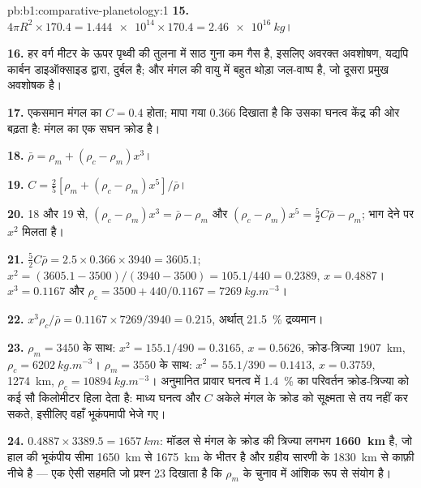 \begin{solution}{pb:b1:comparative-planetology:1}
\textbf{15.} $4\pi R^2\times170.4 = \num{1.444e14}\times170.4 =
\qty{2.46e16}{kg}$।

\textbf{16.} हर वर्ग मीटर के ऊपर पृथ्वी की तुलना में साठ गुना कम गैस है, इसलिए अवरक्त अवशोषण, यद्यपि
कार्बन डाइऑक्साइड द्वारा, दुर्बल है; और मंगल की वायु में बहुत थोड़ा जल-वाष्प है, जो दूसरा प्रमुख
अवशोषक है।

\textbf{17.} एकसमान मंगल का $C = 0.4$ होता; मापा गया 0.366 दिखाता है कि उसका घनत्व केंद्र की ओर बढ़ता
है: मंगल का एक सघन क्रोड है।

\textbf{18.} $\bar\rho = \rho_m + (\rho_c - \rho_m)x^3$।

\textbf{19.} $C = \tfrac25[\rho_m + (\rho_c - \rho_m)x^5]/\bar\rho$।

\textbf{20.} 18 और 19 से, $(\rho_c - \rho_m)x^3 = \bar\rho - \rho_m$ और
$(\rho_c - \rho_m)x^5 = \tfrac52C\bar\rho - \rho_m$; भाग देने पर $x^2$ मिलता है।

\textbf{21.} $\tfrac52C\bar\rho = 2.5\times0.366\times3940 = 3605.1$;
$x^2 = (3605.1 - 3500)/(3940 - 3500) = 105.1/440 = 0.2389$, $x = 0.4887$।
$x^3 = 0.1167$ और $\rho_c = 3500 + 440/0.1167 = \qty{7269}{kg.m^{-3}}$।

\textbf{22.} $x^3\rho_c/\bar\rho = 0.1167\times7269/3940 = 0.215$, अर्थात् \qty{21.5}{\percent} द्रव्यमान।

\textbf{23.} $\rho_m = 3450$ के साथ: $x^2 = 155.1/490 = 0.3165$, $x = 0.5626$,
क्रोड-त्रिज्या \qty{1907}{km}, $\rho_c = \qty{6202}{kg.m^{-3}}$। $\rho_m =
3550$ के साथ: $x^2 = 55.1/390 = 0.1413$, $x = 0.3759$, \qty{1274}{km},
$\rho_c = \qty{10894}{kg.m^{-3}}$। अनुमानित प्रावार घनत्व में \qty{1.4}{\percent} का परिवर्तन क्रोड-त्रिज्या को
कई सौ किलोमीटर हिला देता है: माध्य घनत्व और $C$ अकेले मंगल के क्रोड को सूक्ष्मता से तय नहीं कर सकते, इसीलिए
वहाँ भूकंपमापी भेजे गए।

\textbf{24.} $0.4887\times3389.5 = \qty{1657}{km}$: मॉडल से मंगल के क्रोड की त्रिज्या लगभग
\textbf{\qty[text-series-to-math=true]{1660}{km}} है, जो हाल की भूकंपीय सीमा \qty{1650}{km} से \qty{1675}{km}
के भीतर है और ग्रहीय सारणी के \qty{1830}{km} से काफ़ी नीचे है --- एक ऐसी सहमति जो प्रश्न 23 दिखाता है कि
$\rho_m$ के चुनाव में आंशिक रूप से संयोग है।
\end{solution}
